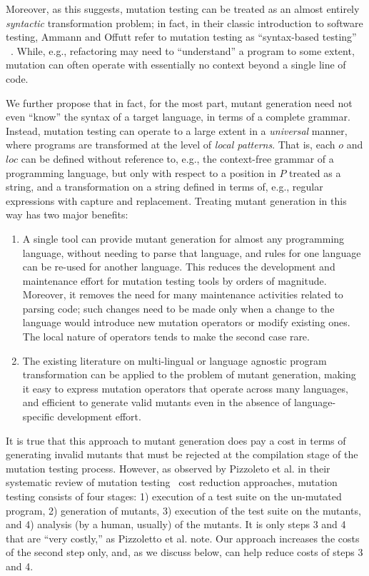 \documentclass[acmsmall,screen,review,anonymous]{acmart}
\begin{document}
Moreover, as this suggests,
mutation testing can be treated as an almost entirely \emph{syntactic}
transformation problem; in fact, in their classic introduction to
software testing, Ammann and Offutt refer to mutation testing as
``syntax-based testing'' ~\cite{ammann2016introduction}.  While, e.g., refactoring may need to
``understand'' a program to some extent, mutation can often operate
with essentially no context beyond a single line of code.

We further propose that in fact, for the most part, mutant
generation need not even ``know'' the syntax of a target language, in
terms of a complete grammar.  Instead, mutation testing can operate to
a large extent in a \emph{universal} manner, where programs are
transformed at the level of \emph{local patterns}.  That is,
each $o$ and $loc$ can be defined without reference to, e.g., the
context-free grammar of a programming language, but only with respect
to a position in $P$ treated as a string, and a transformation on a
string defined in terms of, e.g., regular expressions with capture and
replacement.  Treating mutant generation in this way has two major benefits:

\begin{enumerate}
  \item A single tool can provide mutant generation for almost any
    programming language, without needing to parse that language, and
    rules for one language can be re-used for another language.  This
    reduces the development and maintenance effort for mutation
    testing tools by orders of magnitude.  Moreover, it removes the
    need for many   maintenance activities related to parsing code;
    such changes need to be made only when a change to the language
    would introduce new mutation operators or modify existing ones.
    The local nature of operators tends to make the second case rare.
    \item The existing literature on multi-lingual or language
      agnostic program transformation can be applied to the problem of
      mutant generation, making it easy to express mutation operators
      that operate across many languages, and efficient to generate
      valid mutants even in the absence of language-specific
      development effort.
      \end{enumerate}

It is true that this approach to mutant generation does pay a cost in
terms of generating invalid mutants that must be rejected at the
compilation stage of the mutation testing process.  However, as
observed by Pizzoleto et al. in their systematic review of mutation
testing~\cite{pizzoleto2019systematic} cost reduction approaches, mutation testing consists of four
stages: 1) execution of a test suite on the un-mutated program, 2)
generation of mutants, 3) execution of the test suite on the mutants,
and 4) analysis (by a human, usually) of the mutants.  It is only steps 3
and 4 that are ``very costly,'' as Pizzoletto et al. note.  Our approach increases the costs of
the second step only, and, as we discuss below, can help reduce
costs of steps 3 and 4.
      
\end{document}
